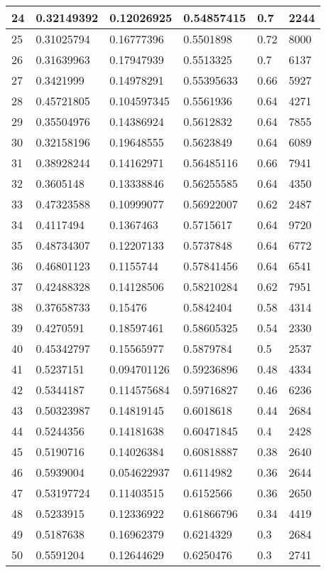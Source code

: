 \begin{longtable}{|l|l|l|l|l|l|}
24 & 0.32149392 & 0.12026925 & 0.54857415 & 0.7 & 2244 \\ \hline 
25 & 0.31025794 & 0.16777396 & 0.5501898 & 0.72 & 8000 \\ \hline 
26 & 0.31639963 & 0.17947939 & 0.5513325 & 0.7 & 6137 \\ \hline 
27 & 0.3421999 & 0.14978291 & 0.55395633 & 0.66 & 5927 \\ \hline 
28 & 0.45721805 & 0.104597345 & 0.5561936 & 0.64 & 4271 \\ \hline 
29 & 0.35504976 & 0.14386924 & 0.5612832 & 0.64 & 7855 \\ \hline 
30 & 0.32158196 & 0.19648555 & 0.5623849 & 0.64 & 6089 \\ \hline 
31 & 0.38928244 & 0.14162971 & 0.56485116 & 0.66 & 7941 \\ \hline 
32 & 0.3605148 & 0.13338846 & 0.56255585 & 0.64 & 4350 \\ \hline 
33 & 0.47323588 & 0.10999077 & 0.56922007 & 0.62 & 2487 \\ \hline 
34 & 0.4117494 & 0.1367463 & 0.5715617 & 0.64 & 9720 \\ \hline 
35 & 0.48734307 & 0.12207133 & 0.5737848 & 0.64 & 6772 \\ \hline 
36 & 0.46801123 & 0.1155744 & 0.57841456 & 0.64 & 6541 \\ \hline 
37 & 0.42488328 & 0.14128506 & 0.58210284 & 0.62 & 7951 \\ \hline 
38 & 0.37658733 & 0.15476 & 0.5842404 & 0.58 & 4314 \\ \hline 
39 & 0.4270591 & 0.18597461 & 0.58605325 & 0.54 & 2330 \\ \hline 
40 & 0.45342797 & 0.15565977 & 0.5879784 & 0.5 & 2537 \\ \hline 
41 & 0.5237151 & 0.094701126 & 0.59236896 & 0.48 & 4334 \\ \hline 
42 & 0.5344187 & 0.114575684 & 0.59716827 & 0.46 & 6236 \\ \hline 
43 & 0.50323987 & 0.14819145 & 0.6018618 & 0.44 & 2684 \\ \hline 
44 & 0.5244356 & 0.14181638 & 0.60471845 & 0.4 & 2428 \\ \hline 
45 & 0.5190716 & 0.14026384 & 0.60818887 & 0.38 & 2640 \\ \hline 
46 & 0.5939004 & 0.054622937 & 0.6114982 & 0.36 & 2644 \\ \hline 
47 & 0.53197724 & 0.11403515 & 0.6152566 & 0.36 & 2650 \\ \hline 
48 & 0.5233915 & 0.12336922 & 0.61866796 & 0.34 & 4419 \\ \hline 
49 & 0.5187638 & 0.16962379 & 0.6214329 & 0.3 & 2684 \\ \hline 
50 & 0.5591204 & 0.12644629 & 0.6250476 & 0.3 & 2741 \\ \hline 
\end{longtable}